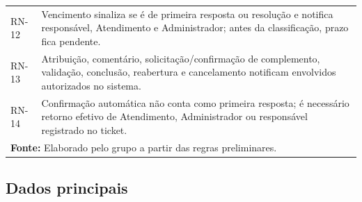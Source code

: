 \begin{longtable}{p{}p{}}
RN-12 & Vencimento sinaliza se é de primeira resposta ou resolução e notifica responsável, Atendimento e Administrador; antes da classificação, prazo fica pendente. \\
RN-13 & Atribuição, comentário, solicitação/confirmação de complemento, validação, conclusão, reabertura e cancelamento notificam envolvidos autorizados no sistema. \\
RN-14 & Confirmação automática não conta como primeira resposta; é necessário retorno efetivo de Atendimento, Administrador ou responsável registrado no ticket. \\
\hline
\multicolumn{2}{l}{\footnotesize\textbf{Fonte:} Elaborado pelo grupo a partir das regras preliminares.}
\end{longtable}

\subsection{Dados principais}

